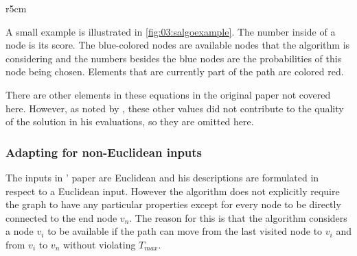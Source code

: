 \begin{wrapfigure}{r}{5cm}
    \centering
    \caption{The S-Algorithm at work.}
    \label{fig:03:salgoexample}
\end{wrapfigure}

A small example is illustrated in \cref{fig:03:salgoexample}.
The number inside of a node is its score. 
The blue-colored nodes are available nodes that the algorithm is considering and the numbers besides the blue nodes are the probabilities of this node being chosen.
Elements that are currently part of the path are colored red.

There are other elements in these equations in the original paper not covered here.
However, as noted by \citeauthor{tsiligiridis_heuristic_1984}, these other values did not contribute to the quality of the solution in his evaluations, so they are omitted here. 

\subsubsection{Adapting for non-Euclidean inputs}

The inputs in \citeauthor{tsiligiridis_heuristic_1984}' paper are Euclidean and his descriptions are formulated in respect to a Euclidean input.
However the algorithm does not explicitly require the graph to have any particular properties except for every node to be directly connected to the end node $v_n$.
The reason for this is that the algorithm considers a node $v_i$ to be available if the path can move from the last visited node to $v_i$ and from $v_i$ to $v_n$ without violating $T_{max}$.

